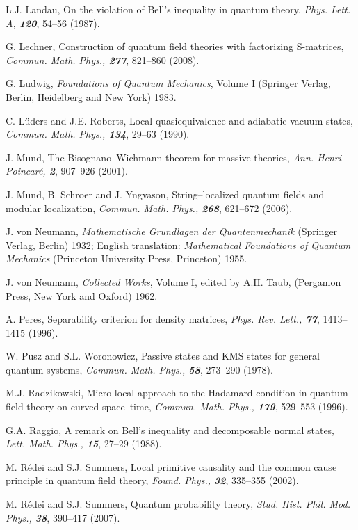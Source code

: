 \documentclass[12pt]{article}
\begin{document}
\begin{thebibliography}{Bor}
L.J. Landau, On the violation of Bell's inequality in quantum theory,
{\sl Phys. Lett. A, \bf 120}, 54--56 (1987).

G. Lechner, Construction of quantum field theories with factorizing
S-matrices, {\sl Commun. Math. Phys., \bf 277}, 821--860 (2008).

G. Ludwig, {\it Foundations of Quantum Mechanics}, Volume I
(Springer Verlag, Berlin, Heidelberg and New York) 1983. 

C. L\"uders and J.E. Roberts, Local quasiequivalence and adiabatic 
vacuum states, {\sl Commun. Math. Phys., \bf 134}, 29--63 (1990).

J. Mund, The Bisognano--Wichmann theorem for massive theories, 
{\sl Ann. Henri Poincar\'e, \bf 2}, 907--926 (2001).

J. Mund, B. Schroer and J. Yngvason, String--localized quantum fields
and modular localization, {\sl Commun. Math. Phys., \bf 268}, 
621--672 (2006).

J. von Neumann, {\it Mathematische Grundlagen der Quantenmechanik}
(Springer Verlag, Berlin) 1932; English translation:
{\it Mathematical Foundations of Quantum Mechanics} (Princeton University
Press, Princeton) 1955.

J. von Neumann, {\it Collected Works}, Volume I, edited by A.H. Taub,
(Pergamon Press, New York and Oxford) 1962.

A. Peres, Separability criterion for density matrices, {\sl Phys. Rev. 
Lett., \bf 77}, 1413--1415 (1996).

W. Pusz and S.L. Woronowicz, Passive states and KMS states
for general quantum systems, {\sl Commun. Math. Phys., \bf 58}, 273--290 
(1978).

M.J. Radzikowski, Micro-local approach to the Hadamard condition in
quantum field theory on curved space--time, {\sl Commun. Math. Phys., \bf 179},
529--553 (1996).

G.A. Raggio, A remark on Bell's inequality and decomposable normal
states, {\sl Lett. Math. Phys., \bf 15}, 27--29 (1988).

M. R\'edei and S.J. Summers, Local primitive causality and the common 
cause principle in quantum field theory, {\sl Found. Phys., \bf 32}, 335--355
(2002).

M. R\'edei and S.J. Summers, Quantum probability theory, 
{\sl Stud. Hist. Phil. Mod. Phys., \bf 38}, 390--417 (2007).


\end{thebibliography}
\end{document}
